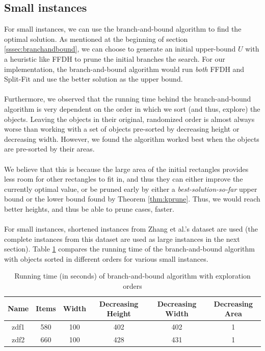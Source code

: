 \documentclass{article}
\begin{document}
\subsection{Small instances}
For small instances, we can use the branch-and-bound algorithm to find the optimal solution. As mentioned at the beginning of section \ref{sssec:branchandbound}, we can choose to generate an initial upper-bound $U$ with a heuristic like FFDH to prune the initial branches the search. For our implementation, the branch-and-bound algorithm would run \textit{both} FFDH and Split-Fit and use the better solution as the upper bound.\\
\\
Furthermore, we observed that the running time behind the branch-and-bound algorithm is very dependent on the order in which we sort (and thus, explore) the objects. Leaving the objects in their original, randomized order is almost always worse than working with a set of objects pre-sorted by decreasing height or decreasing width. However, we found the algorithm worked best when the objects are pre-sorted by their areas.\\
\\
We believe that this is because the large area of the initial rectangles provides less room for other rectangles to fit in, and thus they can either improve the currently optimal value, or be pruned early by either a \textit{best-solution-so-far} upper bound or the lower bound found by Theorem \ref{thm:kprune}. Thus, we would reach better heights, and thus be able to prune cases, faster.\\
\\
For small instances, shortened instances from Zhang et al.'s dataset are used (the complete instances from this dataset are used as large instances in the next section). Table \ref{table:smallinstances} compares the running time of the branch-and-bound algorithm with objects sorted in different orders for various small instances.

\begin{table}
\centering
\begin{tabular}{|c|c|c|c|c|c|}
\hline Name & Items & Width & Decreasing Height & Decreasing Width & Decreasing Area \\
\hline zdf1 & 580 & 100 & 402 & 402 & 1 \\
\hline zdf2 & 660 & 100 & 428 & 431 & 1\\
\hline
\end{tabular}
\caption{Running time (in seconds) of branch-and-bound algorithm with exploration orders}
\label{table:smallinstances}
\end{table}
\end{document}
